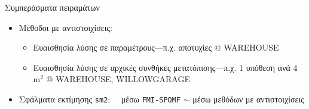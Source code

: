 \begin{frame}{Συμπεράσματα πειραμάτων}

  \begin{itemize}
    \item Μέθοδοι με αντιστοιχίσεις:
      \begin{itemize}
        \item Ευαισθησία λύσης σε παραμέτρους---π.χ. αποτυχίες @ WAREHOUSE
        \item Ευαισθησία λύσης σε αρχικές συνθήκες μετατόπισης---π.χ. 1 υπόθεση ανά 4 m$^2$ @ WAREHOUSE, WILLOWGARAGE
      \end{itemize}
    \item Σφάλματα εκτίμησης \texttt{sm2}: \ \ μέσω \texttt{FMI-SPOMF} $\sim$ μέσω μεθόδων με αντιστοιχίσεις
  \end{itemize}

\end{frame}
